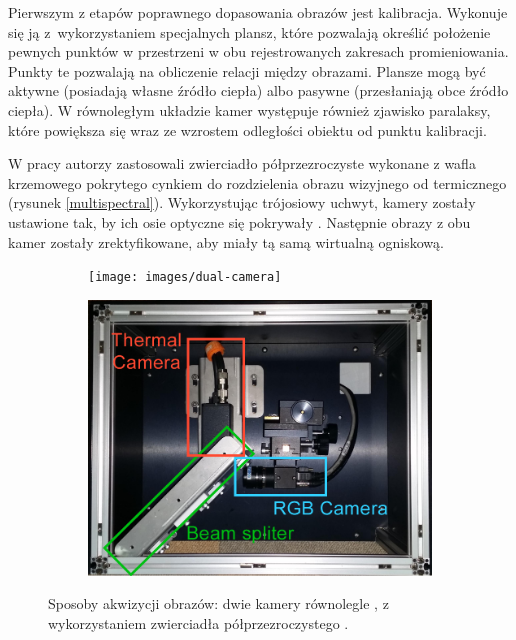 Pierwszym z etapów poprawnego dopasowania obrazów jest kalibracja.
Wykonuje się ją z~wykorzystaniem specjalnych plansz, które pozwalają określić położenie pewnych punktów w przestrzeni w obu rejestrowanych zakresach promieniowania.
Punkty te pozwalają na obliczenie relacji między obrazami.
Plansze mogą być aktywne (posiadają własne źródło ciepła) albo pasywne (przesłaniają obce źródło ciepła).
W równoległym układzie kamer występuje również zjawisko paralaksy, które powiększa się wraz ze wzrostem odległości obiektu od punktu kalibracji.

W pracy \cite{hwang2015multispectral} autorzy zastosowali zwierciadło półprzezroczyste wykonane z wafla krzemowego pokrytego cynkiem do rozdzielenia obrazu wizyjnego od termicznego (rysunek \ref{multispectral}). Wykorzystując trójosiowy uchwyt, kamery zostały ustawione tak, by ich osie optyczne się pokrywały . Następnie obrazy z obu kamer zostały zrektyfikowane, aby miały tą samą wirtualną ogniskową.




\begin{figure}[h]
\centering
\begin{subfigure}{0.45\textwidth}
\centering
\texttt{[image: images/dual-camera]}
\subcaption{\label{dual_camera}}
\end{subfigure}
\begin{subfigure}{0.45\textwidth}
\centering
\includegraphics[width=1\textwidth]{images/multispectral}
\subcaption{\label{multispectral}}
\end{subfigure}
\caption{\label{fig:cameras_systems}Sposoby akwizycji obrazów: \protect{} dwie kamery równolegle \cite{lee2015robust}, \protect{} z wykorzystaniem zwierciadła półprzezroczystego \cite{hwang2015multispectral}.}
\end{figure}


